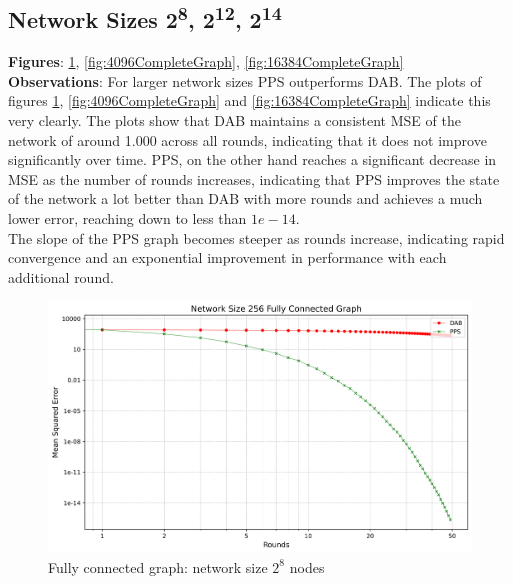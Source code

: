 \subsection{Network Sizes 2\textsuperscript{8}, 2\textsuperscript{12}, 2\textsuperscript{14}}
\textbf{Figures}: \ref{fig:256CompleteGraph}, \ref{fig:4096CompleteGraph}, \ref{fig:16384CompleteGraph}\\
\textbf{Observations}: For larger network sizes PPS outperforms DAB. The plots of figures \ref{fig:256CompleteGraph}, \ref{fig:4096CompleteGraph} and \ref{fig:16384CompleteGraph} indicate this very clearly. The plots show that DAB maintains a consistent MSE of the network of around 1.000 across all rounds, indicating that it does not improve significantly over time. PPS, on the other hand reaches a significant decrease in MSE as the number of rounds increases, indicating that PPS improves the state of the network a lot better than DAB with more rounds and achieves a much lower error, reaching down to less than $1e-14$.\\
The slope of the PPS graph becomes steeper as rounds increase, indicating rapid convergence and an exponential improvement in performance with each additional round.\\
\begin{figure}[H]
    \centering
    \includegraphics[scale=0.5]{figures/completeGraphSimulations/DAB_vs_PPS_FCG_r50_n256.png}
    \caption{Fully connected graph: network size $2^{8}$ nodes}
    \label{fig:256CompleteGraph}
\end{figure}

